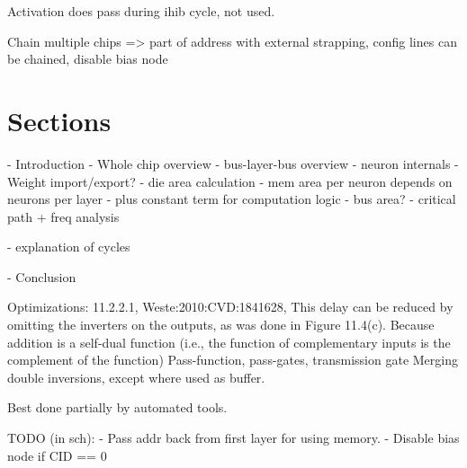 \documentclass[twocolumn]{article}
\begin{document}
Activation does pass during ihib cycle, not used.


Chain multiple chips => part of address with external strapping, config lines can be chained, disable bias node

\section{Sections}
 - Introduction
 - Whole chip overview
 - bus-layer-bus overview
 - neuron internals
   - Weight import/export?
 - die area calculation
   - mem area per neuron depends on neurons per layer
   - plus constant term for computation logic
   - bus area?
 - critical path + freq analysis
   
 - explanation of cycles
 
 - Conclusion


Optimizations:
  11.2.2.1, Weste:2010:CVD:1841628, This delay can be reduced by omitting the inverters on the outputs, as was done in Figure 11.4(c). Because addition is a self-dual function (i.e., the function of complementary inputs is the complement of the function)
  Pass-function, pass-gates, transmission gate
  Merging double inversions, except where used as buffer.
  
  Best done partially by automated tools.


TODO (in sch):
  - Pass addr back from first layer for using memory.
  - Disable bias node if CID == 0
\end{document}
